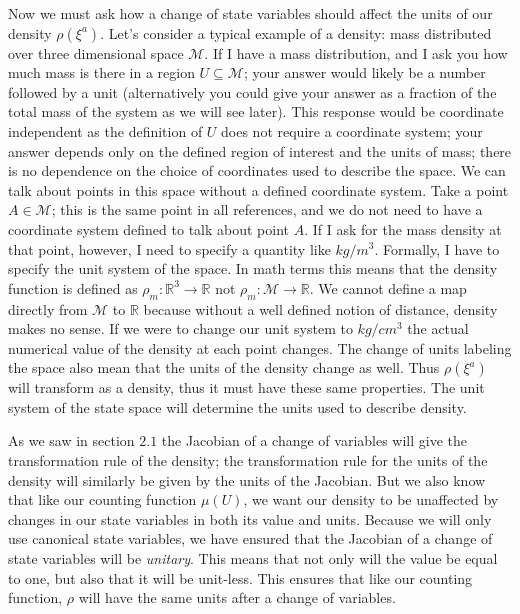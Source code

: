 \documentclass{article}
\begin{document}
	Now we must ask how a change of state variables should affect the units of our density $\rho(\xi^a)$. Let's consider a typical example of a density: mass distributed over three dimensional space $\mathcal{M}$. If I have a mass distribution, and I ask you how much mass is there in a region $U \subseteq \mathcal{M}$; your answer would likely be a number followed by a unit (alternatively you could give your answer as a fraction of the total mass of the system as we will see later). This response would be coordinate independent as the definition of $U$ does not require a coordinate system; your answer depends only on the defined region of interest and the units of mass; there is no dependence on the choice of coordinates used to describe the space. We can talk about points in this space without a defined coordinate system. Take a point $A \in \mathcal{M}$; this is the same point in all references, and we do not need to have a coordinate system defined to talk about point $A$. If I ask for the mass density at that point, however, I need to specify a quantity like $kg/m^3$. Formally, I have to specify the unit system of the space. In math terms this means that the density function is defined as $\rho_m : \mathbb{R}^3 \to \mathbb{R}$ not $\rho_m : \mathcal{M} \to \mathbb{R}$. We cannot define a map directly from $\mathcal{M}$ to $\mathbb{R}$ because without a well defined notion of distance, density makes no sense. If we were to change our unit system to $kg/cm^3$ the actual numerical value of the density at each point changes. The change of units labeling the space also mean that the units of the density change as well. Thus $\rho(\xi^a)$ will transform as a density, thus it must have these same properties. The unit system of the state space will determine the units used to describe density. 
	
	As we saw in section $2.1$ the Jacobian of a change of variables will give the transformation rule of the density; the transformation rule for the units of the density will similarly be given by the units of the Jacobian. But we also know that like our counting function $\mu(U)$, we want our density to be unaffected by changes in our state variables in both its value and units. Because we will only use canonical state variables, we have ensured that the Jacobian of a change of state variables will be \textit{unitary}. This means that not only will the value be equal to one, but also that it will be unit-less. This ensures that like our counting function, $\rho$ will have the same units after a change of variables. 
	
\end{document}
